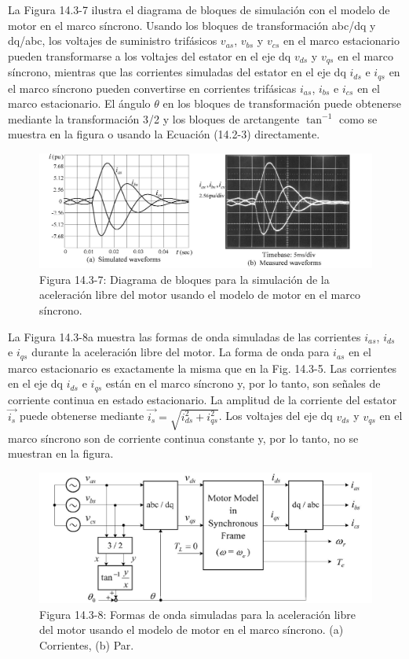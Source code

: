 \documentclass[letterpaper,12pt]{article} %
\begin{document}
La Figura 14.3-7 ilustra el diagrama de bloques de simulación con el modelo de motor en el marco síncrono. Usando los bloques de transformación abc/dq y dq/abc, los voltajes de suministro trifásicos \(v_{as}\), \(v_{bs}\) y \(v_{cs}\) en el marco estacionario pueden transformarse a los voltajes del estator en el eje dq \(v_{ds}\) y \(v_{qs}\) en el marco síncrono, mientras que las corrientes simuladas del estator en el eje dq \(i_{ds}\) e \(i_{qs}\) en el marco síncrono pueden convertirse en corrientes trifásicas \(i_{as}\), \(i_{bs}\) e \(i_{cs}\) en el marco estacionario. El ángulo \(\theta\) en los bloques de transformación puede obtenerse mediante la transformación 3/2 y los bloques de arctangente \(\tan^{-1}\) como se muestra en la figura o usando la Ecuación (14.2-3) directamente.

\begin{figure}[ht]
    \centering
    \includegraphics{graficos/img08.jpg} 
    \caption{Figura 14.3-7: Diagrama de bloques para la simulación de la aceleración libre del motor usando el modelo de motor en el marco síncrono.}
    \label{fig:14.3-7}
\end{figure}
\FloatBarrier

La Figura 14.3-8a muestra las formas de onda simuladas de las corrientes \(i_{as}\), \(i_{ds}\) e \(i_{qs}\) durante la aceleración libre del motor. La forma de onda para \(i_{as}\) en el marco estacionario es exactamente la misma que en la Fig. 14.3-5. Las corrientes en el eje dq \(i_{ds}\) e \(i_{qs}\) están en el marco síncrono y, por lo tanto, son señales de corriente continua en estado estacionario. La amplitud de la corriente del estator \( \vec{i_s} \) puede obtenerse mediante \( \vec{i_s} = \sqrt{i_{ds}^2 + i_{qs}^2} \). Los voltajes del eje dq \(v_{ds}\) y \(v_{qs}\) en el marco síncrono son de corriente continua constante y, por lo tanto, no se muestran en la figura.

\begin{figure}[ht]
    \centering
    \includegraphics{graficos/img09.jpg} 
    \caption{Figura 14.3-8: Formas de onda simuladas para la aceleración libre del motor usando el modelo de motor en el marco síncrono. (a) Corrientes, (b) Par.}
    \label{fig:14.3-8}
\end{figure}
\FloatBarrier
\end{document}

